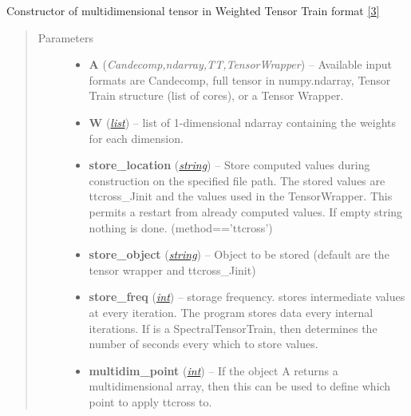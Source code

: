 \documentclass[a4paper,10pt,english]{sphinxmanual}
\begin{document}
\begin{fulllineitems}
\label{api-wttvec:TensorToolbox.core.WTTvec}
Constructor of multidimensional tensor in Weighted Tensor Train format {\hyperref[zrefs:oseledets2011]{{[}3{]}}}
\begin{quote}\begin{description}
\item[{Parameters}] \leavevmode\begin{itemize}
\item {} 
\textbf{A} (\emph{Candecomp,ndarray,TT,TensorWrapper}) -- Available input formats are Candecomp, full tensor in numpy.ndarray, Tensor Train structure (list of cores), or a Tensor Wrapper.

\item {} 
\textbf{W} (\href{http://docs.python.org/library/functions.html\#list}{\emph{list}}) -- list of 1-dimensional ndarray containing the weights for each dimension.

\item {} 
\textbf{store\_location} (\href{http://docs.python.org/library/string.html\#module-string}{\emph{string}}) -- Store computed values during construction on the specified file path. The stored values are ttcross\_Jinit and the values used in the TensorWrapper. This permits a restart from already computed values. If empty string nothing is done. (method=='ttcross')

\item {} 
\textbf{store\_object} (\href{http://docs.python.org/library/string.html\#module-string}{\emph{string}}) -- Object to be stored (default are the tensor wrapper and ttcross\_Jinit)

\item {} 
\textbf{store\_freq} (\href{http://docs.python.org/library/functions.html\#int}{\emph{int}}) -- storage frequency.  stores intermediate values at every iteration. The program stores data every  internal iterations. If  is a SpectralTensorTrain, then  determines the number of seconds every which to store values.

\item {} 
\textbf{multidim\_point} (\href{http://docs.python.org/library/functions.html\#int}{\emph{int}}) -- If the object A returns a multidimensional array, then this can be used to define which point to apply ttcross to.


\end{itemize}
\end{description}
\end{quote}
\end{fulllineitems}
\end{document}
